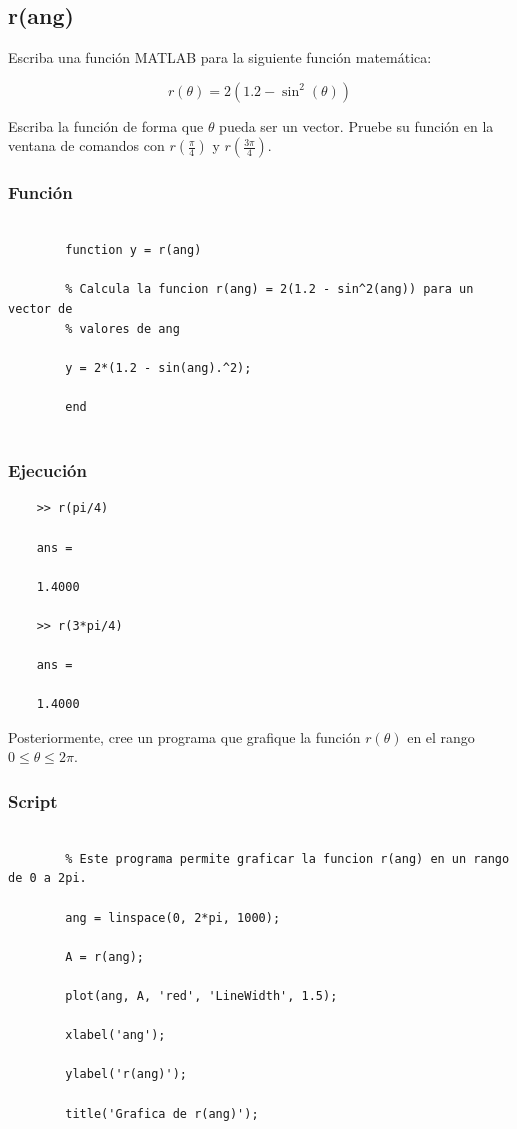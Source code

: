 \documentclass{article}
\begin{document}
	\newpage
	\subsection{r(ang)}
	
	Escriba una función MATLAB para la siguiente función matemática:
	
	\begin{equation*}
		r(\theta) = 2(1.2 - \sin^2(\theta))
	\end{equation*}
	
	Escriba la función de forma que $\theta$ pueda ser un vector. Pruebe su función en la ventana de comandos con $r(\frac{\pi}{4})$ y $r(\frac{3\pi}{4})$.
	
	\subsubsection{Función}
	
	\begin{lstlisting}
		
		function y = r(ang)
		
		% Calcula la funcion r(ang) = 2(1.2 - sin^2(ang)) para un vector de
		% valores de ang
		
		y = 2*(1.2 - sin(ang).^2);
		
		end
		
	\end{lstlisting}
	
	\subsubsection{Ejecución}
	
	\begin{lstlisting}
	>> r(pi/4)
	
	ans =
	
	1.4000
	
	>> r(3*pi/4)
	
	ans =
	
	1.4000
	\end{lstlisting}
	
	Posteriormente, cree un programa que grafique la función $r(\theta)$ en el rango $0 \leq \theta \leq 2\pi$.
	
	\subsubsection{Script}
	
	\begin{lstlisting}
		
		% Este programa permite graficar la funcion r(ang) en un rango de 0 a 2pi.
		
		ang = linspace(0, 2*pi, 1000);
		
		A = r(ang);
		
		plot(ang, A, 'red', 'LineWidth', 1.5);
		
		xlabel('ang');
		
		ylabel('r(ang)');
		
		title('Grafica de r(ang)');
		
	\end{lstlisting}
	
\end{document}
